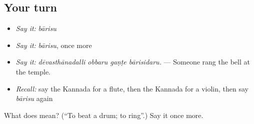 \subsection*{Your turn}
\begin{itemize}
\raggedright
  \item \emph{Say it:} \emph{bārisu}
  \item \emph{Say it:} \emph{bārisu}, once more
  \item \emph{Say it:} \emph{dēvasthānadalli obbaru gaṇṭe bārisidaru.} — Someone rang the bell at the temple.
  \item \emph{Recall:} say the Kannada for a flute, then the Kannada for a violin, then say \emph{bārisu} again
\end{itemize}

\begin{tcolorbox}[breakable,colback=teal!4,colframe=teal!35!black,title={Before you move on}]
What does  mean? (\textquotedblleft{}To beat a drum; to ring\textquotedblright{}.) Say it once more.
\end{tcolorbox}

